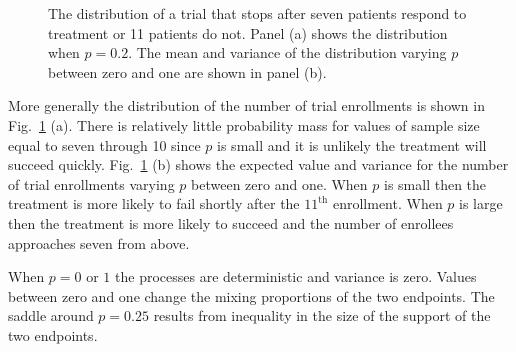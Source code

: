 \documentclass[review]{elsarticle}
\begin{document}
\begin{figure}[bp!]
\centering
{}
\hfill
{}
\caption{
The distribution of a trial that stops after seven patients respond to treatment
or 11 patients do not. Panel (a) shows the distribution when
$p = 0.2$. The mean and variance of the distribution varying $p$ 
between zero and one are shown in panel (b).
}
\label{fig:exp-and-var}
\end{figure}

More generally the distribution of the number of trial enrollments is shown in 
Fig.~\ref{fig:exp-and-var} (a). There is relatively little probability mass
for values of sample size equal to seven through 10 since $p$ is small and it 
is unlikely the treatment will succeed quickly.
Fig.~\ref{fig:exp-and-var} (b) shows the expected value and variance for the
number of trial enrollments varying $p$ between zero and one. When $p$ is
small then the treatment
is more likely to fail shortly after the $11^{\text{th}}$ enrollment.
When $p$ is large then the treatment is more likely to succeed and the 
number of enrollees approaches seven from above. 

When $p=0$ or $1$ the processes are deterministic and variance is zero.
Values between zero and one change the mixing proportions of 
the two endpoints. The saddle around $p=0.25$ results from inequality 
in the size of the support of the two endpoints.
\end{document}
